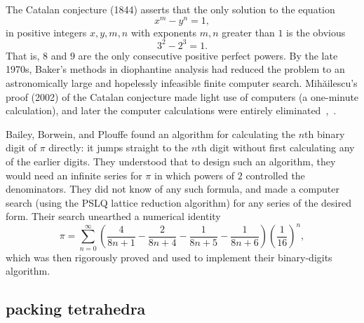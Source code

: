 \documentclass{llncs}
\begin{document}

\smallskip

The Catalan conjecture (1844) asserts that the only solution to the equation
\[
x^m - y^n = 1,
\]
in positive integers $x,y,m,n$ with exponents $m,n$ greater than $1$
is the obvious
\[
3^2 - 2^3 = 1.
\]
That is, $8$ and $9$ are the only consecutive positive perfect powers.
By the late 1970s, Baker's methods in diophantine analysis had reduced
the problem to an astronomically large and hopelessly infeasible finite
computer search.  Mih\u ailescu's proof (2002) of the Catalan
conjecture made light use of computers (a one-minute calculation), and
later the computer calculations were entirely eliminated~\cite{Mih},~\cite{TM03}.

\smallskip


Bailey, Borwein, and Plouffe found an algorithm for calculating the
$n$th binary digit of $\pi$ directly: it jumps straight to the $n$th
digit without first calculating any of the earlier digits.  They
understood that to design such an algorithm, they would need an
infinite series for $\pi$ in which powers of $2$ controlled the
denominators.  They did not know of any such formula, and made a
computer search (using the PSLQ lattice reduction algorithm) for any
series of the desired form.  Their search unearthed a numerical
identity
\[
\pi = \sum_{n=0}^\infty 
\left(
\frac{4}{8n+1} - \frac{2}{8n+4} - \frac{1}{8n+5} - \frac{1}{8n+6}
\right) 
\left(\frac{1}{16}\right)^n,
\]
which was then rigorously proved and used to implement their
binary-digits algorithm.






\subsection{packing  tetrahedra}
\end{document}
